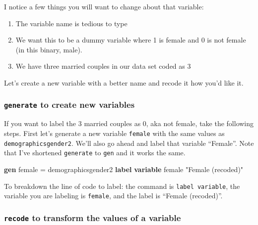 \documentclass[
]{book}
\newenvironment{Shaded}{\begin{snugshade}}{\end{snugshade}}
\newcommand{\KeywordTok}[1]{\textcolor[rgb]{0.13,0.29,0.53}{\textbf{#1}}}
\newcommand{\NormalTok}[1]{#1}
\newcommand{\StringTok}[1]{\textcolor[rgb]{0.31,0.60,0.02}{#1}}
\providecommand{\tightlist}{%
  \setlength{\itemsep}{0pt}\setlength{\parskip}{0pt}}
\begin{document}
I notice a few things you will want to change about that variable:

\begin{enumerate}
\def\labelenumi{\alph{enumi})}
\tightlist
\item
  The variable name is tedious to type
\item
  We want this to be a dummy variable where 1 is female and 0 is not female (in this binary, male).
\item
  We have three married couples in our data set coded as 3
\end{enumerate}

Let's create a new variable with a better name and recode it how you'd like it.

\hypertarget{generate}{%
\subsubsection*{\texorpdfstring{\texttt{generate} to create new variables}{generate to create new variables}}\label{generate}}

If you want to label the 3 married couples as 0, aka not female, take the following steps. First let's generate a new variable \texttt{female} with the same values as \texttt{demographicsgender2}. We'll also go ahead and label that variable ``Female''. Note that I've shortened \texttt{generate} to \texttt{gen} and it works the same.

\begin{Shaded}
\begin{Highlighting}[]
\KeywordTok{gen}\NormalTok{ female = demographicsgender2}
\KeywordTok{label} \KeywordTok{variable}\NormalTok{ female }\StringTok{"Female (recoded)"}
\end{Highlighting}
\end{Shaded}

To breakdown the line of code to label: the command is \texttt{label\ variable}, the variable you are labeling is \texttt{female}, and the label is ``Female (recoded)''.

\hypertarget{recode}{%
\subsubsection*{\texorpdfstring{\texttt{recode} to transform the values of a variable}{recode to transform the values of a variable}}\label{recode}}
\end{document}

